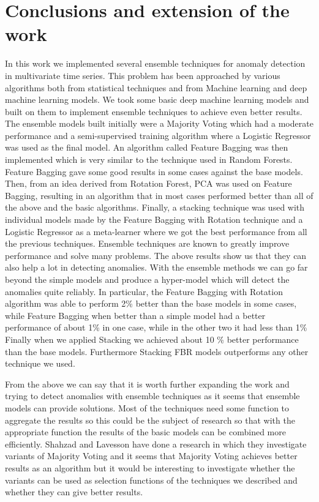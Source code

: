 \documentclass[a4paper,12pt]{report}
\theoremstyle{definitionNODot}
\begin{document}
	\section{Conclusions and extension of the work}
	In this work we implemented several ensemble techniques for anomaly detection in multivariate time series. This problem has been approached by various algorithms both from statistical techniques and from Machine learning and deep machine learning models. We took some basic deep machine learning models and built on them to implement ensemble techniques to achieve even better results. The ensemble models built initially were a Majority Voting which had a moderate performance and a semi-supervised training algorithm where a Logistic Regressor was used as the final model. An algorithm called Feature Bagging was then implemented which is very similar to the technique used in Random Forests. Feature Bagging gave some good results in some cases against the base models. Then, from an idea derived from Rotation Forest, PCA was used on Feature Bagging, resulting in an algorithm that in most cases performed better than all of the above and the basic algorithms. Finally, a stacking technique was used with individual models made by the Feature Bagging with Rotation technique and a Logistic Regressor as a meta-learner where we got the best performance from all the previous techniques. Ensemble techniques are known to greatly improve performance and solve many problems. The above results show us that they can also help a lot in detecting anomalies. With the ensemble methods we can go far beyond the simple models and produce a hyper-model which will detect the anomalies quite reliably. In particular, the Feature Bagging with Rotation algorithm was able to perform 2\% better than the base models in some cases, while Feature Bagging when better than a simple model had a better performance of about 1\% in one case, while in the other two it had less than 1\% Finally when we applied Stacking we achieved about 10 \% better performance than the base models. Furthermore Stacking FBR models outperforms any other technique we used.
	
	From the above we can say that it is worth further expanding the work and trying to detect anomalies with ensemble techniques as it seems that ensemble models can provide solutions. Most of the techniques need some function to aggregate the results so this could be the subject of research so that with the appropriate function the results of the basic models can be combined more efficiently. Shahzad and Lavesson have done a research \cite{shahzad2013comparative} in which they investigate variants of Majority Voting and it seems that Majority Voting achieves better results as an algorithm but it would be interesting to investigate whether the variants can be used as selection functions of the techniques we described and whether they can give better results.
	
\end{document}
